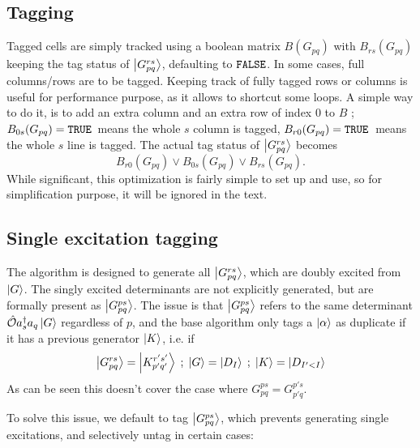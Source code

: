 \documentclass[./thesis.tex]{subfiles}
\begin{document}
\subsection{Tagging}

Tagged cells are simply tracked using a boolean matrix $B(G_{pq})$ with $B_{rs}(G_{pq})$ keeping the tag status of $\ket{G^{rs}_{pq}}$, defaulting to ${\text{\texttt{FALSE}}}$.
In some cases, full columns/rows are to be tagged. Keeping track of fully tagged rows or columns is useful for performance purpose, as it allows to shortcut some loops. A simple way to do it, is to add an extra column and an extra row of index $0$ to $B$ ; $B_{0s}(G_{pq}) = {\text{\texttt{TRUE}}}\,$ means the whole $s$ column is tagged, $B_{r0}(G_{pq}) = {\text{\texttt{TRUE}}}\,$ means the whole $s$ line is tagged. The actual tag status of $\ket{G^{rs}_{pq}}$ becomes
\begin{equation}
B_{r0}(G_{pq}) \vee B_{0s}(G_{pq}) \vee B_{rs}(G_{pq}).
\end{equation}
While significant, this optimization is fairly simple to set up and use, so for simplification purpose, it will be ignored in the text.


\subsection{Single excitation tagging}
\label{single_tagging}
The algorithm is designed to generate all $\ket {G_{pq}^{rs}}$, which are doubly excited from $\ket G$. The singly excited determinants are not explicitly generated, but are formally present as $\ket{G_{pq}^{ps}}$.
The issue is that $\ket{G_{pq}^{ps}}$ refers to the same determinant ${\hat{\mathcal{O}}} a^\dagger_s a_q \ket{G}$ regardless of $p$, and the base algorithm only tags a ${\ket{\alpha}}$ as duplicate if it has a previous generator $\ket K$, i.e. if
\begin{equation}
\ket {G_{pq}^{rs}} = \ket {K_{p'q'}^{r's'}} \; ; \; \ket G = \ket {D_I} \; ; \; \ket K = \ket {D_{I'<I}}
\end{equation}
As can be seen this doesn't cover the case where $G_{pq}^{ps} = G_{p'q}^{p's}$.

To solve this issue, we default to tag $\ket {G_{pq}^{ps}}$, which prevents generating single excitations, and selectively untag in certain cases:
\end{document}
